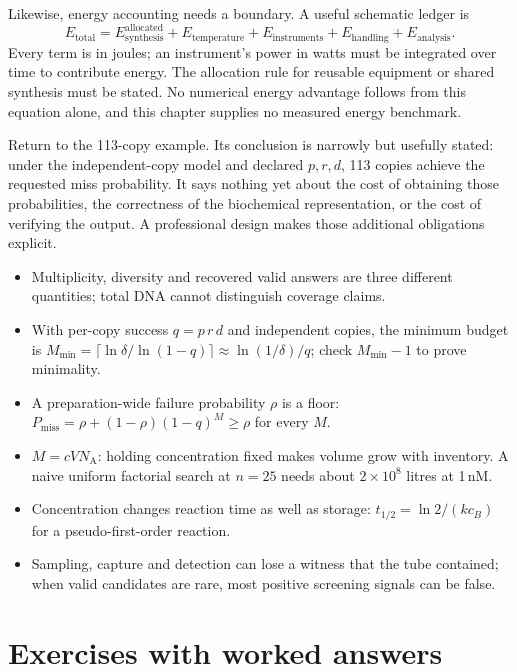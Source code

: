 Likewise, energy accounting needs a boundary. A useful schematic ledger is
\begin{equation}
E_{\mathrm{total}}=E_{\mathrm{synthesis}}^{\mathrm{allocated}}
+E_{\mathrm{temperature}}+E_{\mathrm{instruments}}
+E_{\mathrm{handling}}+E_{\mathrm{analysis}}.
\end{equation}
Every term is in joules; an instrument's power in watts must be integrated over time to contribute energy. The allocation rule for reusable equipment or shared synthesis must be stated. No numerical energy advantage follows from this equation alone, and this chapter supplies no measured energy benchmark.

Return to the 113-copy example. Its conclusion is narrowly but usefully stated: under the independent-copy model and declared $p,r,d$, 113 copies achieve the requested miss probability. It says nothing yet about the cost of obtaining those probabilities, the correctness of the biochemical representation, or the cost of verifying the output. A professional design makes those additional obligations explicit.

\begin{KeyIdeas}
\begin{itemize}\setlength{\itemsep}{2pt}
\item Multiplicity, diversity and recovered valid answers are three different
quantities; total DNA cannot distinguish coverage claims.
\item With per-copy success $q=p\,r\,d$ and independent copies, the minimum budget is
$M_{\min}=\lceil\ln\delta/\ln(1-q)\rceil\approx\ln(1/\delta)/q$; check $M_{\min}-1$ to
prove minimality.
\item A preparation-wide failure probability $\rho$ is a floor:
$P_{\mathrm{miss}}=\rho+(1-\rho)(1-q)^M\ge\rho$ for every $M$.
\item $M=cVN_{\mathrm A}$: holding concentration fixed makes volume grow with
inventory. A naive uniform factorial search at $n=25$ needs about
$2\times10^{8}$ litres at 1\,nM.
\item Concentration changes reaction time as well as storage:
$t_{1/2}=\ln2/(kc_B)$ for a pseudo-first-order reaction.
\item Sampling, capture and detection can lose a witness that the tube contained;
when valid candidates are rare, most positive screening signals can be false.
\end{itemize}
\end{KeyIdeas}

\section{Exercises with worked answers}

